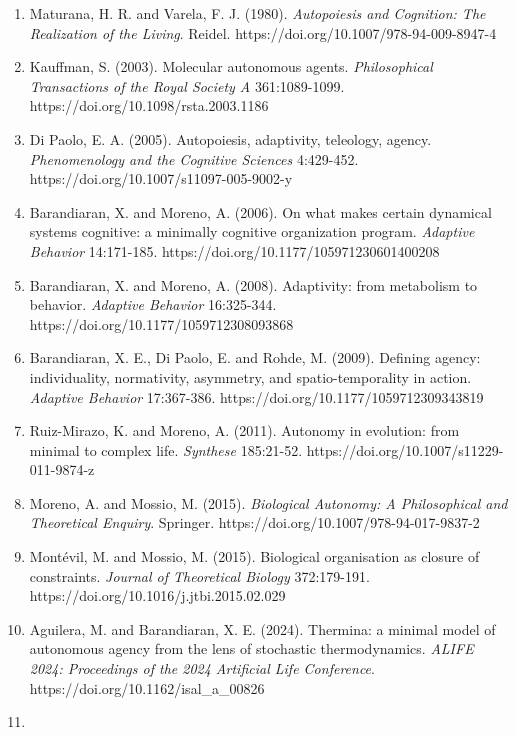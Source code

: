 \documentclass[
  10pt,
]{article}
\begin{document}
\begin{enumerate}
  POMDPs: a step towards a formal understanding of agency. In
  \emph{Active Inference: IWAI 2022}, Communications in Computer and
  Information Science 1721, Springer, pp.~16-31.
  https://doi.org/10.1007/978-3-031-28719-0\_2
\item
  Maturana, H. R. and Varela, F. J. (1980). \emph{Autopoiesis and
  Cognition: The Realization of the Living}. Reidel.
  https://doi.org/10.1007/978-94-009-8947-4
\item
  Kauffman, S. (2003). Molecular autonomous agents. \emph{Philosophical
  Transactions of the Royal Society A} 361:1089-1099.
  https://doi.org/10.1098/rsta.2003.1186
\item
  Di Paolo, E. A. (2005). Autopoiesis, adaptivity, teleology, agency.
  \emph{Phenomenology and the Cognitive Sciences} 4:429-452.
  https://doi.org/10.1007/s11097-005-9002-y
\item
  Barandiaran, X. and Moreno, A. (2006). On what makes certain dynamical
  systems cognitive: a minimally cognitive organization program.
  \emph{Adaptive Behavior} 14:171-185.
  https://doi.org/10.1177/105971230601400208
\item
  Barandiaran, X. and Moreno, A. (2008). Adaptivity: from metabolism to
  behavior. \emph{Adaptive Behavior} 16:325-344.
  https://doi.org/10.1177/1059712308093868
\item
  Barandiaran, X. E., Di Paolo, E. and Rohde, M. (2009). Defining
  agency: individuality, normativity, asymmetry, and spatio-temporality
  in action. \emph{Adaptive Behavior} 17:367-386.
  https://doi.org/10.1177/1059712309343819
\item
  Ruiz-Mirazo, K. and Moreno, A. (2011). Autonomy in evolution: from
  minimal to complex life. \emph{Synthese} 185:21-52.
  https://doi.org/10.1007/s11229-011-9874-z
\item
  Moreno, A. and Mossio, M. (2015). \emph{Biological Autonomy: A
  Philosophical and Theoretical Enquiry}. Springer.
  https://doi.org/10.1007/978-94-017-9837-2
\item
  Montévil, M. and Mossio, M. (2015). Biological organisation as closure
  of constraints. \emph{Journal of Theoretical Biology} 372:179-191.
  https://doi.org/10.1016/j.jtbi.2015.02.029
\item
  Aguilera, M. and Barandiaran, X. E. (2024). Thermina: a minimal model
  of autonomous agency from the lens of stochastic thermodynamics.
  \emph{ALIFE 2024: Proceedings of the 2024 Artificial Life Conference}.
  https://doi.org/10.1162/isal\_a\_00826
\item

\end{enumerate}
\end{document}
